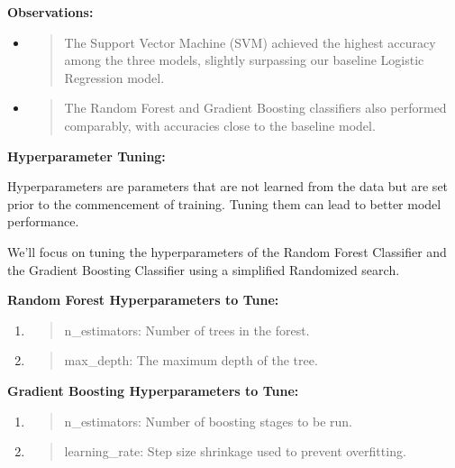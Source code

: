 \documentclass[]{article}
\begin{document}
\textbf{Observations:}

\begin{itemize}
\item
  \begin{quote}
  The Support Vector Machine (SVM) achieved the highest accuracy among
  the three models, slightly surpassing our baseline Logistic Regression
  model.
  \end{quote}
\item
  \begin{quote}
  The Random Forest and Gradient Boosting classifiers also performed
  comparably, with accuracies close to the baseline model.
  \end{quote}
\end{itemize}

\textbf{Hyperparameter Tuning:}

Hyperparameters are parameters that are not learned from the data but
are set prior to the commencement of training. Tuning them can lead to
better model performance.

We'll focus on tuning the hyperparameters of the Random Forest
Classifier and the Gradient Boosting Classifier using a simplified
Randomized search.

\textbf{Random Forest Hyperparameters to Tune:}

\begin{enumerate}
\def\labelenumi{\arabic{enumi}.}
\item
  \begin{quote}
  n\_estimators: Number of trees in the forest.
  \end{quote}
\item
  \begin{quote}
  max\_depth: The maximum depth of the tree.
  \end{quote}
\end{enumerate}

\textbf{Gradient Boosting Hyperparameters to Tune:}

\begin{enumerate}
\def\labelenumi{\arabic{enumi}.}
\item
  \begin{quote}
  n\_estimators: Number of boosting stages to be run.
  \end{quote}
\item
  \begin{quote}
  learning\_rate: Step size shrinkage used to prevent overfitting.
  \end{quote}
\end{enumerate}
\end{document}
